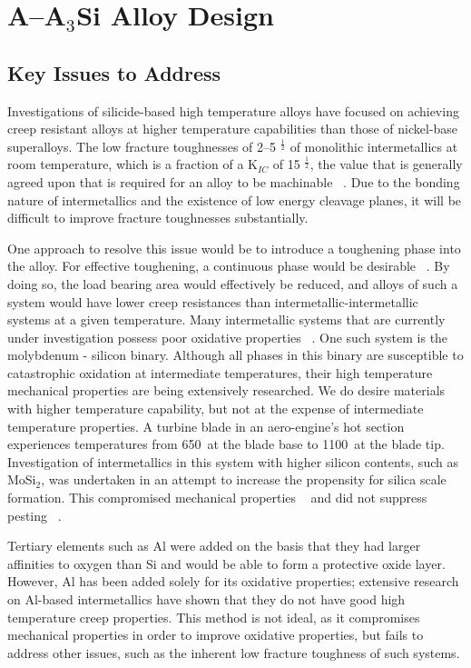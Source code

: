 \section{A--A$_3$Si Alloy Design}
\subsection{Key Issues to Address}
Investigations of silicide-based high temperature alloys have focused on achieving creep resistant alloys at higher temperature capabilities than those of nickel-base superalloys. The low fracture toughnesses of 2--5 \mega\pascal\usk\meter$^{\frac{1}{2}}$ of monolithic intermetallics at room temperature, which is a fraction of a K$_{IC}$ of 15 \mega\pascal\usk\meter$^{\frac{1}{2}}$, the value that is generally agreed upon that is required for an alloy to be machinable ~\cite{raj95}. Due to the bonding nature of intermetallics and the existence of low energy cleavage planes, it will be difficult to improve fracture toughnesses substantially.

One approach to resolve this issue would be to introduce a toughening phase into the alloy.  For effective toughening, a continuous phase would be desirable ~\cite{kahn80}. By doing so, the load bearing area would effectively be reduced, and alloys of such a system would have lower creep resistances than intermetallic-intermetallic systems at a given temperature. Many intermetallic systems that are currently under investigation possess poor oxidative properties ~\cite{harris97}. One such system is the molybdenum - silicon binary.  Although all phases in this binary are susceptible to catastrophic oxidation at intermediate temperatures, their high temperature mechanical properties are being extensively researched. We do desire materials with higher temperature capability, but not at the expense of intermediate temperature properties. A turbine blade in an aero-engine's hot section experiences temperatures from 650\celsius\ at the blade base to 1100\celsius\ at the blade tip. Investigation of intermetallics in this system with higher silicon contents, such as MoSi$_2$, was undertaken in an attempt to increase the propensity for silica scale formation.  This compromised mechanical properties ~\cite{rawn01} and did not suppress pesting ~\cite{yanagihara96}. 

Tertiary elements such as Al were added on the basis that they had larger affinities to oxygen than Si and would be able to form a protective oxide layer.  However, Al has been added solely for its oxidative properties; extensive research on Al-based intermetallics have shown that they do not have good high temperature creep properties. This method is not ideal, as it compromises mechanical properties in order to improve oxidative properties, but fails to address other issues, such as the inherent low fracture toughness of such systems. 

